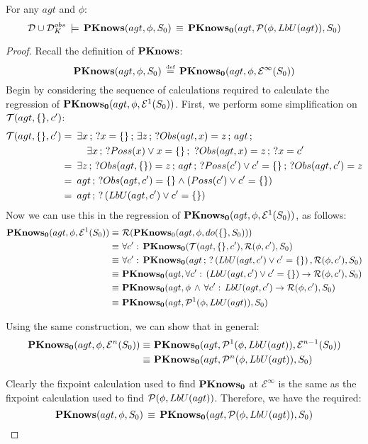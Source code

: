 \begin{lemmaext}
[{{[}{\ref{thm:Pknows_LbU_S0}}]}] For any $agt$ and $\phi$:\[
\mathcal{D}\cup\mathcal{D}_{K}^{obs}\,\models\,\mathbf{PKnows}(agt,\phi,S_{0})\,\equiv\,\mathbf{PKnows_{0}}(agt,\mathcal{P}(\phi,LbU(agt)),S_{0})\]

\end{lemmaext}
\begin{proof}
Recall the definition of $\mathbf{PKnows}$:\[
\mathbf{PKnows}(agt,\phi,S_{0})\,\stackrel{\mbox{\tiny def}}{=}\,\mathbf{PKnows_{0}}(agt,\phi,\mathcal{E}^{\infty}(S_{0}))\]
 Begin by considering the sequence of calculations required to calculate
the regression of $\mathbf{PKnows_{0}}(agt,\phi,\mathcal{E}^{1}(S_{0}))$. First,
we perform some simplification on $\mathcal{T}(agt,\{\},c')$:\begin{align*}
\mathcal{T}(agt,\{\},c')=\,\,\, & \exists x\,;\,?x=\{\}\,;\,\exists z\,;\,?Obs(agt,x)=z\,;\, agt\,;\\
 & \,\,\,\,\,\,\exists x\,;\,?Poss(x)\vee x=\{\}\,;\,\,?Obs(agt,x)=z\,;\,?x=c'\\
=\,\,\, & \exists z\,;\,?Obs(agt,\{\})=z\,;\, agt\,;\,?Poss(c')\vee c'=\{\}\,;\,?Obs(agt,c')=z\\
=\,\,\, & agt\,;\,?Obs(agt,c')=\{\}\wedge\left(Poss(c')\vee c'=\{\}\right)\\
=\,\,\, & agt\,;\,?\left(LbU(agt,c')\vee c'=\{\}\right)\end{align*}
 Now we can use this in the regression of $\mathbf{PKnows_{0}}(agt,\phi,\mathcal{E}^{1}(S_{0}))$,
as follows: \begin{align*}
\mathbf{PKnows_{0}}(agt,\phi,\mathcal{E}^{1}(S_{0}))\equiv\,\, & \mathcal{R}(\mathbf{PKnows}_{0}(agt,\phi,do(\{\},S_{0})))\\
\equiv\,\, & \forall c':\,\mathbf{PKnows_{0}}(\mathcal{T}(agt,\{\},c'),\mathcal{R}(\phi,c'),S_{0})\\
\equiv\,\, & \forall c':\,\mathbf{PKnows_{0}}(agt\,;\,?\left(LbU(agt,c')\vee c'=\{\}\right),\mathcal{R}(\phi,c'),S_{0})\\
\equiv\,\, & \mathbf{PKnows_{0}}(agt,\forall c':\,\left(LbU(agt,c')\vee c'=\{\}\right)\rightarrow\mathcal{R}(\phi,c'),S_{0})\\
\equiv\,\, & \mathbf{PKnows_{0}}(agt,\phi\,\wedge\,\forall c':\, LbU(agt,c')\rightarrow\mathcal{R}(\phi,c'),S_{0})\\
\equiv\,\, & \mathbf{PKnows_{0}}(agt,\mathcal{P}^{1}(\phi,LbU(agt)),S_{0})\end{align*}


Using the same construction, we can show that in general:\begin{align*}
\mathbf{PKnows_{0}}(agt,\phi,\mathcal{E}^{n}(S_{0}))\equiv\,\, & \mathbf{PKnows_{0}}(agt,\mathcal{P}^{1}(\phi,LbU(agt)),\mathcal{E}^{n-1}(S_{0}))\\
\equiv\,\, & \mathbf{PKnows_{0}}(agt,\mathcal{P}^{n}(\phi,LbU(agt)),S_{0})\end{align*}


Clearly the fixpoint calculation used to find $\mathbf{PKnows_{0}}$ at $\mathcal{E}^{\infty}$
is the same as the fixpoint calculation used to find $\mathcal{P}(\phi,LbU(agt))$.
Therefore, we have the required:\[
\mathbf{PKnows}(agt,\phi,S_{0})\,\equiv\,\mathbf{PKnows_{0}}(agt,\mathcal{P}(\phi,LbU(agt)),S_{0})\]

\end{proof}
\medskip{}


